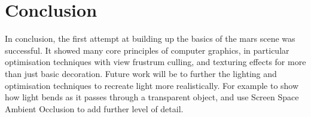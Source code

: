 \documentclass[conference]{acmsiggraph}
\begin{document}
\section{Conclusion}
In conclusion, the first attempt at building up the basics of the mars scene was successful. It showed many core principles of computer graphics, in particular optimisation techniques with view frustrum culling, and texturing effects for more than just basic decoration. Future work will be to further the lighting and optimisation techniques to recreate light more realistically. For example to show how light bends as it passes through a transparent object, and use Screen Space Ambient Occlusion to add further level of detail.


\end{document}
